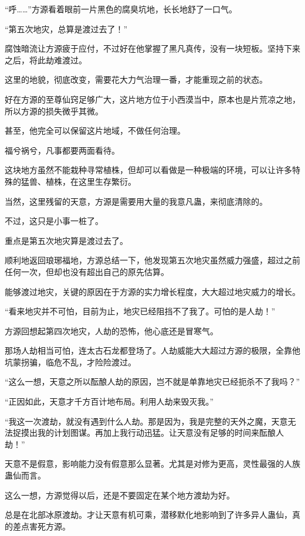 
\begin{this_body}

“呼……”方源看着眼前一片黑色的腐臭坑地，长长地舒了一口气。

“第五次地灾，总算是渡过去了！”

腐蚀暗流让方源疲于应付，不过好在他掌握了黑凡真传，没有一块短板。坚持下来之后，将此劫难渡过。

这里的地貌，彻底改变，需要花大力气治理一番，才能重现之前的状态。

好在方源的至尊仙窍足够广大，这片地方位于小西漠当中，原本也是片荒凉之地，所以方源的损失微乎其微。

甚至，他完全可以保留这片地域，不做任何治理。

福兮祸兮，凡事都要两面看待。

这块地方虽然不能栽种寻常植株，但却可以看做是一种极端的环境，可以让许多特殊的猛兽、植株，在这里生存繁衍。

当然，这里残留的天意，方源是需要用大量的我意凡蛊，来彻底清除的。

不过，这只是小事一桩了。

重点是第五次地灾算是渡过去了。

顺利地返回琅琊福地，方源总结一下，他发现第五次地灾虽然威力强盛，超过之前任何一次，但却也没有超出自己的原先估算。

能够渡过地灾，关键的原因在于方源的实力增长程度，大大超过地灾威力的增长。

“看来地灾并不可怕，目前为止，地灾已经阻挡不了我了。可怕的是人劫！”

方源回想起第四次地灾，人劫的恐怖，他心底还是冒寒气。

那场人劫相当可怕，连太古石龙都登场了。人劫威能大大超过方源的极限，全靠他坑蒙拐骗，临危不乱，才险险渡过。

“这么一想，天意之所以酝酿人劫的原因，岂不就是单靠地灾已经扼杀不了我吗？”

“正因如此，天意才千方百计地布局。利用人劫来毁灭我。”

“我这一次渡劫，就没有遇到什么人劫。那是因为，我是完整的天外之魔，天意无法捉摸出我的计划图谋。再加上我行动迅猛。让天意没有足够的时间来酝酿人劫！”

天意不是假意，影响能力没有假意那么显著。尤其是对修为更高，灵性最强的人族蛊仙而言。

这么一想，方源觉得以后，还是不要固定在某个地方渡劫为好。

总是在北部冰原渡劫。才让天意有机可乘，潜移默化地影响到了许多异人蛊仙，真的差点害死方源。


\end{this_body}
